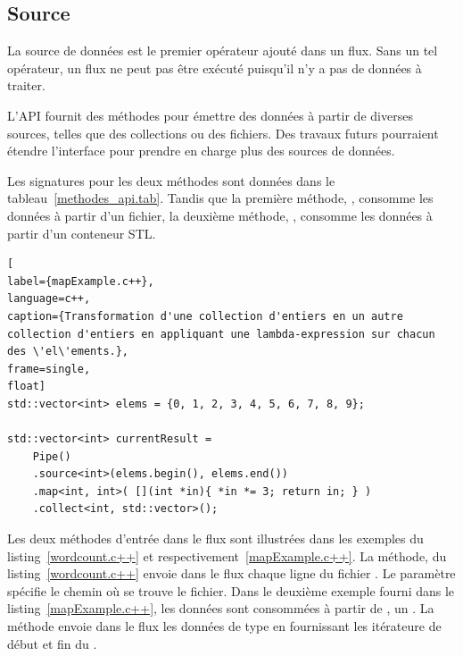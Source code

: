 

\subsection{Source}

La source de donn\'ees est le premier op\'erateur ajout\'e dans un flux. Sans un tel op\'erateur, un flux ne peut pas \^etre ex\'ecut\'e puisqu'il n'y a pas de donn\'ees \`a traiter. 

L'API fournit des m\'ethodes pour \'emettre des donn\'ees \`a partir de diverses sources, telles que des collections ou des fichiers. Des travaux futurs pourraient \'etendre l'interface pour prendre en charge plus des sources de donn\'ees. 




Les signatures pour les deux m\'ethodes sont donn\'ees dans le tableau~\ref{methodes_api.tab}. Tandis que la premi\`ere m\'ethode, , consomme les donn\'ees \`a partir d'un fichier, la deuxi\`eme m\'ethode, , consomme les donn\'ees \`a partir d'un conteneur STL.


\begin{lstlisting}[
label={mapExample.c++},
language=c++,
caption={Transformation d'une collection d'entiers en un autre collection d'entiers en appliquant une lambda-expression sur chacun des \'el\'ements.},
frame=single,
float]
std::vector<int> elems = {0, 1, 2, 3, 4, 5, 6, 7, 8, 9};

std::vector<int> currentResult =
    Pipe()
    .source<int>(elems.begin(), elems.end())
    .map<int, int>( [](int *in){ *in *= 3; return in; } )
    .collect<int, std::vector>();            
\end{lstlisting}




Les deux m\'ethodes d'entr\'ee dans le flux sont illustr\'ees dans les exemples du listing~\ref{wordcount.c++} et respectivement~\ref{mapExample.c++}. La m\'ethode,  du listing~\ref{wordcount.c++} envoie dans le flux chaque ligne du fichier . Le param\`etre  sp\'ecifie le chemin o\`u se trouve le fichier. Dans le deuxième exemple fourni dans le listing~\ref{mapExample.c++}, les donn\'ees sont consomm\'ees \`a partir de , un . La m\'ethode  envoie dans le flux les donn\'ees de type  en fournissant les it\'erateure de d\'ebut et fin du .


